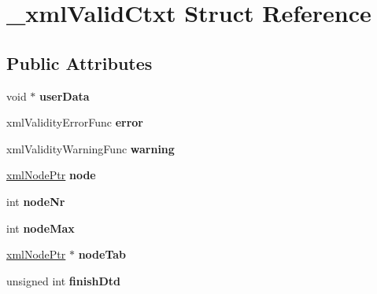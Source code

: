 \hypertarget{struct__xml_valid_ctxt}{}\section{\+\_\+xml\+Valid\+Ctxt Struct Reference}
\label{struct__xml_valid_ctxt}
\subsection*{Public Attributes}
\begin{DoxyCompactItemize}
\item 
\mbox{\label{struct__xml_valid_ctxt_a669355aa1f3621673694e0860e4f78b5}} 
void $\ast$ {\bfseries user\+Data}
\item 
\mbox{\label{struct__xml_valid_ctxt_a67cb1147c3d53a4cb2920987b091ff7a}} 
xml\+Validity\+Error\+Func {\bfseries error}
\item 
\mbox{\label{struct__xml_valid_ctxt_af4ce21729ce719fd2c84e7c8d1f69413}} 
xml\+Validity\+Warning\+Func {\bfseries warning}
\item 
\mbox{\label{struct__xml_valid_ctxt_a3b3eca74a3d7965394d7cda4974e673a}} 
\mbox{\hyperlink{struct__xml_node}{xml\+Node\+Ptr}} {\bfseries node}
\item 
\mbox{\label{struct__xml_valid_ctxt_a22247258390f6c2d960e26d915aa8bcb}} 
int {\bfseries node\+Nr}
\item 
\mbox{\label{struct__xml_valid_ctxt_acb50c245f7c4afbdb5b5e6d56f108d97}} 
int {\bfseries node\+Max}
\item 
\mbox{\label{struct__xml_valid_ctxt_ac9084ffd1c5f9d43a8809177ef838810}} 
\mbox{\hyperlink{struct__xml_node}{xml\+Node\+Ptr}} $\ast$ {\bfseries node\+Tab}
\item 
\mbox{\label{struct__xml_valid_ctxt_a34ff820a3378c7742c09f6daeacd4db5}} 
unsigned int {\bfseries finish\+Dtd}
\item 
\mbox{\label{struct__xml_valid_ctxt_a1f084e858e3a50fa87696738c6d6a019}} 

\end{DoxyCompactItemize}
